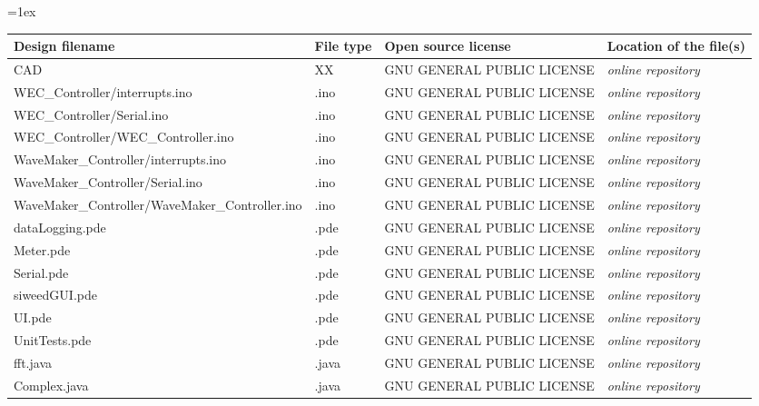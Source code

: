 \documentclass[11pt, letterpaper]{article}
\begin{document}
\tabulinesep=1ex
\begin{tabu} to \linewidth {|X|X|X[1.5,1]|X[1.5,1]|}
\hline
\textbf{Design filename} & \textbf{File type} & \textbf{Open source license} & \textbf{Location of the file(s)} \\\hline
CAD & XX& GNU GENERAL PUBLIC LICENSE & \textit{online repository}\\\hline
WEC\_Controller\slash interrupts.ino & .ino & GNU GENERAL PUBLIC LICENSE& \textit{online repository} \\\hline
WEC\_Controller\slash Serial.ino & .ino & GNU GENERAL PUBLIC LICENSE& \textit{online repository} \\\hline
WEC\_Controller\slash WEC\_Controller.ino & .ino & GNU GENERAL PUBLIC LICENSE& \textit{online repository} \\\hline
WaveMaker\_Controller\slash interrupts.ino & .ino & GNU GENERAL PUBLIC LICENSE& \textit{online repository} \\\hline
WaveMaker\_Controller\slash Serial.ino & .ino & GNU GENERAL PUBLIC LICENSE& \textit{online repository} \\\hline
WaveMaker\_Controller\slash WaveMaker\_Controller.ino & .ino & GNU GENERAL PUBLIC LICENSE& \textit{online repository} \\\hline
dataLogging.pde & .pde& GNU GENERAL PUBLIC LICENSE & \textit{online repository} \\\hline
Meter.pde & .pde& GNU GENERAL PUBLIC LICENSE & \textit{online repository} \\\hline
Serial.pde & .pde& GNU GENERAL PUBLIC LICENSE & \textit{online repository} \\\hline
siweedGUI.pde & .pde& GNU GENERAL PUBLIC LICENSE & \textit{online repository} \\\hline
UI.pde & .pde& GNU GENERAL PUBLIC LICENSE & \textit{online repository} \\\hline
UnitTests.pde & .pde& GNU GENERAL PUBLIC LICENSE & \textit{online repository} \\\hline
fft.java & .java& GNU GENERAL PUBLIC LICENSE & \textit{online repository} \\\hline
Complex.java & .java& GNU GENERAL PUBLIC LICENSE & \textit{online repository} \\\hline
\end{tabu}
\newline
\end{document}
